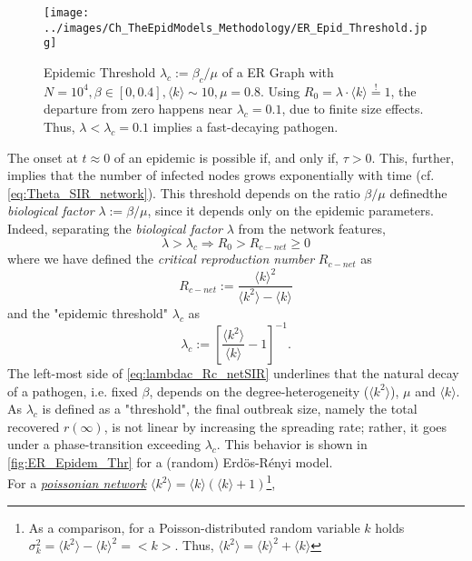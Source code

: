 \documentclass[a4paper,10pt,twoside]{book} %
\theoremstyle{definition}
\begin{document}
\begin{figure}[t]
	\texttt{[image: ../images/Ch\_TheEpidModels\_Methodology/ER\_Epid\_Threshold.jpg]}
	\centering
	\caption{Epidemic Threshold $\lambda_c := \beta_c / \mu$ of a ER Graph with $N = 10^{4}, \beta \in [0,0.4], \langle k \rangle \sim 10, \mu = 0.8$. Using $ R_0 = \lambda \cdot \langle k \rangle \stackrel{!}{=}1$, the departure from zero happens near $\lambda_c = 0.1$, due to finite size effects. Thus, $\lambda < \lambda_c = 0.1$ implies a fast-decaying pathogen.}
	\label{fig:ER_Epidem_Thr}
\end{figure}

The onset at $t \approx 0$  of an epidemic is possible if, and only if, $\tau > 0$. This, further, implies that the number of infected nodes grows exponentially with time (cf. \autoref{eq:Theta_SIR_network}). This threshold depends on the ratio $\beta / \mu$ definedthe \textit{biological factor} $ \lambda := \beta/ \mu$, since it depends only on the epidemic parameters.  
Indeed, separating the \textit{biological factor} $\lambda$ from the network features, 
\begin{equation}
	\lambda > 
	\lambda_c
	\Rightarrow
	R_0 > R_{c-net} \geq 0
	\label{eq:lambdac_Rc_netSIR}
\end{equation}
where we have defined the \textit{critical reproduction number}  $ R_{c-net}$ as
\begin{equation}
	R_{c-net} := \frac{ \langle k \rangle^2 }{\langle k^2 \rangle-\langle k \rangle}
	\label{eq:def_R_cnet}
\end{equation}
and the "epidemic threshold" $ \lambda_c$ as
\begin{equation}
	\lambda_c:=\left[ \frac{\langle k^2 \rangle}{\langle k \rangle} - 1\right]^{-1}.
	\label{eq:def_lambdac}
\end{equation}
The left-most side of \autoref{eq:lambdac_Rc_netSIR} underlines that the natural decay of a pathogen, i.e. fixed $ \beta$, depends on the degree-heterogeneity ($\langle k^2 \rangle$), $ \mu$  and $\langle k \rangle$. \\ 
As $\lambda_c$ is defined as a "threshold", the final outbreak size, namely the total recovered $r(\infty)$, is not linear by increasing the spreading rate; rather, it goes under a phase-transition exceeding $\lambda_c$. This behavior is shown in \autoref{fig:ER_Epidem_Thr} for a (random) Erdös-Rényi model. 
\\For a \underline{\textit{poissonian network}} $\langle k^2 \rangle = \langle k \rangle (\langle k \rangle + 1 )$\footnote{As a comparison, for a Poisson-distributed random variable $k$ holds $\sigma_k^2 = \langle k^2 \rangle - \langle k \rangle^2 = <k>$. Thus, $\langle k^2 \rangle = \langle k \rangle^2 + \langle k \rangle$}, 
\end{document}
